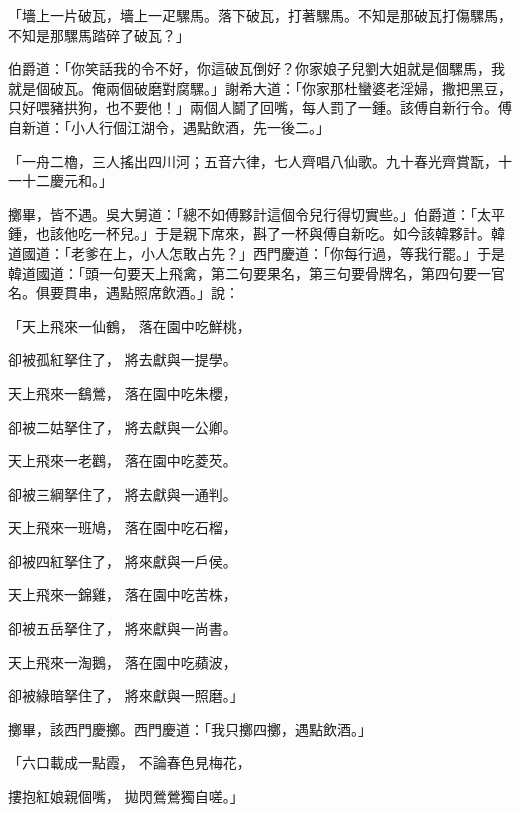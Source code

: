 \begin{showcontents}{}
「墻上一片破瓦，墻上一疋騾馬。落下破瓦，打著騾馬。不知是那破瓦打傷騾馬，不知是那騾馬踏碎了破瓦？」

伯爵道：「你笑話我的令不好，你這破瓦倒好？你家娘子兒劉大姐就是個騾馬，我就是個破瓦。俺兩個破磨對腐騾。」謝希大道：「你家那杜蠻婆老淫婦，撒把黑豆，只好喂豬拱狗，也不要他！」兩個人鬬了回嘴，每人罰了一鍾。該傅自新行令。傅自新道：「小人行個江湖令，遇點飲酒，先一後二。」

「一舟二櫓，三人搖出四川河；五音六律，七人齊唱八仙歌。九十春光齊賞翫，十一十二慶元和。」

擲畢，皆不遇。吳大舅道：「總不如傅黟計這個令兒行得切實些。」伯爵道：「太平鍾，也該他吃一杯兒。」于是親下席來，斟了一杯與傅自新吃。如今該韓夥計。韓道國道：「老爹在上，小人怎敢占先？」西門慶道：「你每行過，等我行罷。」于是韓道國道：「頭一句要天上飛禽，第二句要果名，第三句要骨牌名，第四句要一官名。俱要貫串，遇點照席飲酒。」說：

「天上飛來一仙鶴，  落在園中吃鮮桃，

卻被孤紅拏住了，  將去獻與一提學。

天上飛來一鷂鶯，  落在園中吃朱櫻，

卻被二姑拏住了，  將去獻與一公卿。

天上飛來一老鸛，  落在園中吃菱芡。

卻被三綱拏住了，  將去獻與一通判。

天上飛來一班鳩，  落在園中吃石榴，

卻被四紅拏住了，  將來獻與一戶侯。

天上飛來一錦雞，  落在園中吃苦株，

卻被五岳拏住了，  將來獻與一尚書。

天上飛來一淘鵝，  落在園中吃蘋波，

卻被綠暗拏住了，  將來獻與一照磨。」

擲畢，該西門慶擲。西門慶道：「我只擲四擲，遇點飲酒。」

「六口載成一點霞，  不論春色見梅花，

摟抱紅娘親個嘴，  拋閃鶯鶯獨自嗟。」


\end{showcontents}
